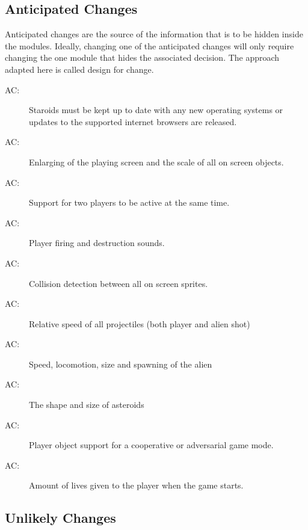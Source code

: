 \documentclass[12pt, titlepage]{article}
\newcounter{acnum}
\newcommand{\actheacnum}{AC\theacnum}
\begin{document}
\subsection{Anticipated Changes} \label{SecAchange}

Anticipated changes are the source of the information that is to be hidden inside the modules. Ideally, changing one of the anticipated changes will only require changing the one module that hides the associated decision. The approach adapted here is called design for change.

\begin{description}
\item[ \actheacnum \label{acHardware}:] Staroids must be kept up to date with any new operating systems or updates to the supported internet browsers are released.
\item[ \actheacnum \label{acUtilities}:] Enlarging of the playing screen and the scale of all on screen objects.
\item[ \actheacnum \label{acUtilities}:] Support for two players to be active at the same time.
\item[ \actheacnum \label{acSound}:] Player firing and destruction sounds.
\item[ \actheacnum \label{acGameobject}:] Collision detection between all on screen sprites.
\item[ \actheacnum \label{acGameobject}:] Relative speed of all projectiles (both player and alien shot)
\item[ \actheacnum \label{acGameobject}:] Speed, locomotion, size and spawning of the alien
\item[ \actheacnum \label{acGameobject}:] The shape and size of asteroids
\item[ \actheacnum \label{acGameobject}:] Player object support for a cooperative or adversarial game mode.
\item[ \actheacnum \label{acGamestate}:] Amount of lives given to the player when the game starts.

\end{description}

\subsection{Unlikely Changes} \label{SecUchange}
\end{document}
